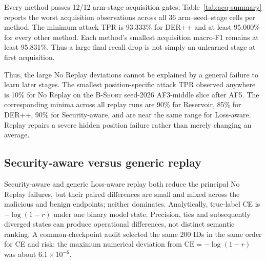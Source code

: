 \documentclass[conference]{IEEEtran}
\newcommand{\bshort}{\textsc{B-Short}}
\newcommand{\af}[1]{\textsc{AF#1}}
\begin{document}
Every method passes 12/12 arm-stage acquisition gates; Table~\ref{tab:acq-summary} reports the worst acquisition observations across all 36 arm--seed--stage cells per method. The minimum attack TPR is 93.333\% for DER++ and at least 95.000\% for every other method. Each method's smallest acquisition macro-F1 remains at least 95.831\%. Thus a large final recall drop is not simply an unlearned stage at first acquisition.

\begin{table}[t]
\caption{Worst acquisition diagnostics (percent) across every arm, stage, and seed. Gate counts here are per-seed cells.}
\label{tab:acq-summary}

\centering
\small
{}


\end{table}

 Thus, the large No Replay deviations cannot be explained by a general failure to learn later stages. The smallest position-specific attack TPR observed anywhere is 10\% for No Replay on the \bshort{} seed-2026 \af{3}-middle slice after \af{5}. The corresponding minima across all replay runs are 90\% for Reservoir, 85\% for DER++, 90\% for Security-aware, and are near the same range for Loss-aware. Replay repairs a severe hidden position failure rather than merely changing an average.

\subsection{Security-aware versus generic replay}

Security-aware and generic Loss-aware replay both reduce the principal No Replay failures, but their paired differences are small and mixed across the malicious and benign endpoints; neither dominates. Analytically, true-label CE is $-\log(1-r)$ under one binary model state. Precision, ties and subsequently diverged states can produce operational differences, not distinct semantic ranking. A common-checkpoint audit selected the same 200 IDs in the same order for CE and risk; the maximum numerical deviation from $\mathrm{CE}=-\log(1-r)$ was about $6.1\times10^{-6}$.
\end{document}
